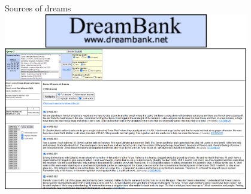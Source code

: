 \documentclass[xcolor=x11names,compress]{beamer}
\begin{document}
{
    \begin{frame}[t]{Sources of dreams}
        \centering
            \includegraphics[width=0.8\textwidth]{immagini/dream_bank}
    \end{frame}}
\end{document}
